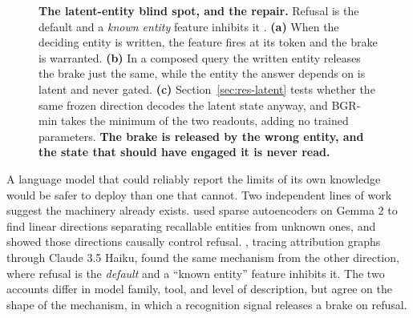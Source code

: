 \documentclass{article}
\begin{document}
\begin{figure}[h]
\vspace{-0.35em}
\caption{\textbf{The latent-entity blind spot, and the repair.} Refusal is the default and a
\emph{known entity} feature inhibits it \citep{ferrando2025entity,lindsey2025biology}. \textbf{(a)}
When the deciding entity is written, the feature fires at its token and the brake is warranted.
\textbf{(b)} In a composed query the written entity releases the brake just the same, while the
entity the answer depends on is latent and never gated. \textbf{(c)} Section~\ref{sec:res-latent}
tests whether the same frozen direction decodes the latent state anyway, and BGR-min takes the minimum
of the two readouts, adding no trained parameters. \textbf{The brake is released by the wrong entity,
and the state that should have engaged it is never read.}}
\label{fig:teaser}
\end{figure}

A language model that could reliably report the limits of its own knowledge would be safer to deploy
than one that cannot. Two independent lines of work suggest the machinery already exists.
\citet{ferrando2025entity} used sparse autoencoders on Gemma 2 to find linear directions separating
recallable entities from unknown ones, and showed those directions causally control refusal.
\citet{lindsey2025biology}, tracing attribution graphs through Claude 3.5 Haiku, found the same
mechanism from the other direction, where refusal is the \emph{default} and a ``known entity''
feature inhibits it. The two accounts differ in model family, tool, and level of description, but
agree on the shape of the mechanism, in which a recognition signal releases a brake on refusal.
\end{document}
